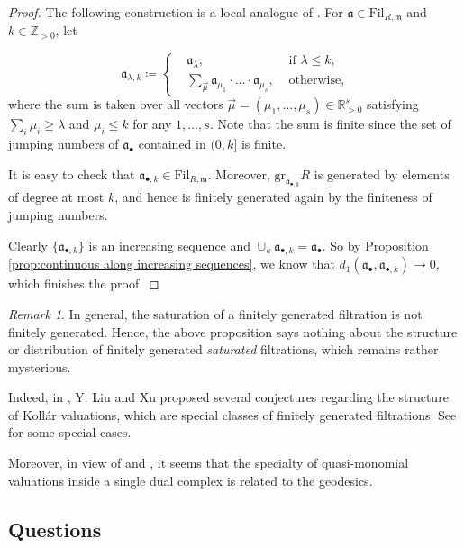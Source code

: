 \documentclass[11pt, leqno]{amsart}%
\theoremstyle{plain}
\theoremstyle{definition}
\theoremstyle{remark}
\newtheorem{remark}[theorem]{Remark}
\newcommand{\bR}{\mathbb{R}}
\newcommand{\bZ}{\mathbb{Z}}
\newcommand{\fa}{\mathfrak{a}}
\newcommand{\fm}{\mathfrak{m}}
\newcommand{\gr}{\mathrm{gr}}
\newcommand{\Fil}{\mathrm{Fil}}
\numberwithin{equation}{section}
\begin{document}
\begin{proof}
    The following construction is a local analogue of \cite[Definition-Lemma 3.56]{Xu25}. For $\fa\in\Fil_{R,\fm}$ and $k\in\bZ_{>0}$, let

    \[
        \fa_{\lambda,k}\coloneqq\left\{\begin{aligned}
            &\fa_\lambda, &\text{ if } \lambda\le k,\\
            &\sum_{\vec{\mu}} \fa_{\mu_1}\cdot \ldots \cdot \fa_{\mu_s}, &\text{ otherwise,}
        \end{aligned}
        \right.
    \]
    where the sum is taken over all vectors $\vec\mu=(\mu_1,\ldots,\mu_s)\in \bR_{>0}^s$ satisfying $\sum_i \mu_i\ge\lambda$ and $\mu_i\le k$ for any $1,\ldots,s$. Note that the sum is finite since the set of jumping numbers of $\fa_\bullet$ contained in $(0,k]$ is finite.

    It is easy to check that $\fa_{\bullet,k}\in\Fil_{R,\fm}$. Moreover, $\gr_{\fa_{\bullet,k}} R$ is generated by elements of degree at most $k$, and hence is finitely generated again by the finiteness of jumping numbers.

    Clearly $\{\fa_{\bullet,k}\}$ is an increasing sequence and $\cup_k \fa_{\bullet,k}=\fa_\bullet$. So by Proposition \ref{prop:continuous along increasing sequences}, we know that $d_1(\fa_\bullet,\fa_{\bullet,k})\to 0$, which finishes the proof.
\end{proof}

\begin{remark}\label{rmk:valuation fg}
    In general, the saturation of a finitely generated filtration is not finitely generated. Hence, the above proposition says nothing about the structure or distribution of finitely generated \emph{saturated} filtrations, which remains rather mysterious.
    
    Indeed, in \cite{LX24}, Y. Liu and Xu proposed several conjectures regarding the structure of Koll\'ar valuations, which are special classes of finitely generated filtrations. See \cites{ABB+23,LXZ22,Pen25} for some special cases.
    
    Moreover, in view of \cite[Section 4]{LXZ22} and \cite[Section 4.3]{XZ25}, it seems that the specialty of quasi-monomial valuations inside a single dual complex is related to the geodesics. 
\end{remark}


\subsection{Questions}
\end{document}
